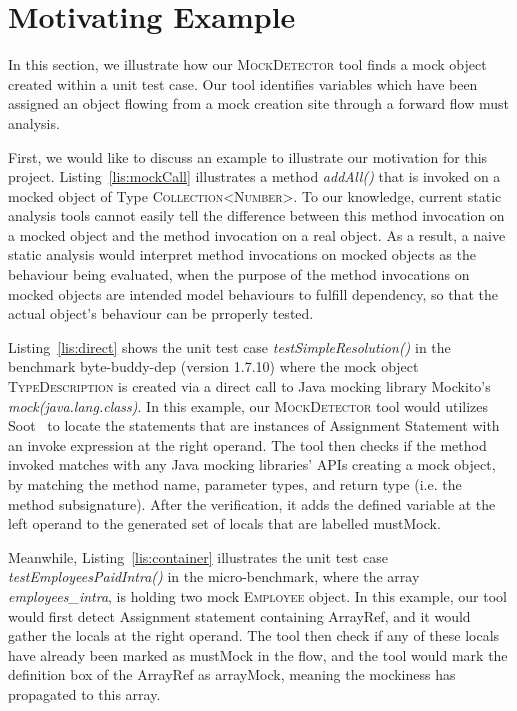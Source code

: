 \section{Motivating Example}
\label{sec:motivating-example}

In this section, we illustrate how our \textsc{MockDetector} tool finds a mock object created within a unit test case. Our tool identifies variables which have been assigned an object flowing from a mock creation site through a forward flow must analysis.

First, we would like to discuss an example to illustrate our motivation for this project. Listing~\ref{lis:mockCall} illustrates a method \textit{addAll()} that is invoked on a mocked object of Type \textsc{Collection<Number>}. To our knowledge, current static analysis tools cannot easily tell the difference between this method invocation on a mocked object and the method invocation on a real object. As a result, a naive static analysis would interpret method invocations on mocked objects as the behaviour being evaluated, when the purpose of the method invocations on mocked objects are intended model behaviours to fulfill dependency, so that the actual object's behaviour can be prroperly tested.

Listing~\ref{lis:direct} shows the unit test case \textit{testSimpleResolution()} in the benchmark byte-buddy-dep (version 1.7.10) where the mock object \textsc{TypeDescription} is created via a direct call to Java mocking library Mockito's \textit{mock(java.lang.class)}. In this example, our \textsc{MockDetector} tool would utilizes Soot~\cite{Vallee-Rai:1999:SJB:781995.782008} to locate the statements that are instances of Assignment Statement with an invoke expression at the right operand. The tool then checks if the method invoked matches with any Java mocking libraries' APIs creating a mock object, by matching the method name, parameter types, and return type (i.e. the method subsignature).  After the verification, it adds the defined variable at the left operand to the generated set of locals that are labelled mustMock.

Meanwhile, Listing~\ref{lis:container} illustrates the unit test case \textit{testEmployeesPaidIntra()} in the micro-benchmark, where the array \textit{employees\_intra}, is holding two mock \textsc{Employee} object. In this example, our tool would first detect Assignment statement containing ArrayRef, and it would gather the locals at the right operand. The tool then check if any of these locals have already been marked as mustMock in the flow, and the tool would mark the definition box of the ArrayRef as arrayMock, meaning the mockiness has propagated to this array. 

